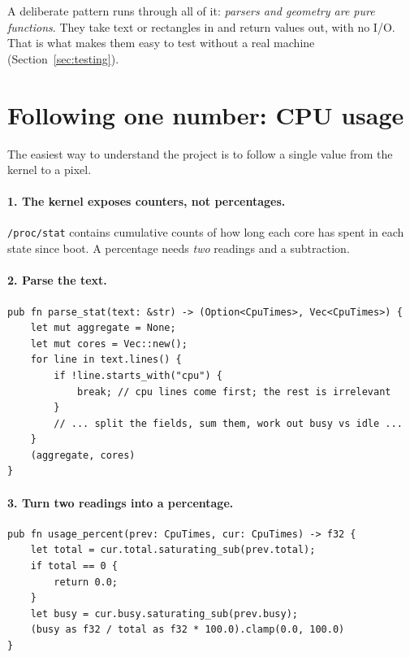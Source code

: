 \documentclass[11pt,a4paper]{article}
\newcommand{\file}[1]{\texttt{#1}}
\begin{document}
A deliberate pattern runs through all of it: \emph{parsers and geometry are pure functions}.
They take text or rectangles in and return values out, with no I/O. That is what makes them
easy to test without a real machine (Section~\ref{sec:testing}).

\section{Following one number: CPU usage}

The easiest way to understand the project is to follow a single value from the kernel to a
pixel.

\paragraph{1. The kernel exposes counters, not percentages.}
\file{/proc/stat} contains cumulative counts of how long each core has spent in each state
since boot. A percentage needs \emph{two} readings and a subtraction.

\paragraph{2. Parse the text.}
\begin{lstlisting}[caption={Parsing \file{/proc/stat} (\file{sampler/cpu.rs}, trimmed).}]
pub fn parse_stat(text: &str) -> (Option<CpuTimes>, Vec<CpuTimes>) {
    let mut aggregate = None;
    let mut cores = Vec::new();
    for line in text.lines() {
        if !line.starts_with("cpu") {
            break; // cpu lines come first; the rest is irrelevant
        }
        // ... split the fields, sum them, work out busy vs idle ...
    }
    (aggregate, cores)
}
\end{lstlisting}

\paragraph{3. Turn two readings into a percentage.}
\begin{lstlisting}[caption={The subtraction (\file{sampler/cpu.rs}).}]
pub fn usage_percent(prev: CpuTimes, cur: CpuTimes) -> f32 {
    let total = cur.total.saturating_sub(prev.total);
    if total == 0 {
        return 0.0;
    }
    let busy = cur.busy.saturating_sub(prev.busy);
    (busy as f32 / total as f32 * 100.0).clamp(0.0, 100.0)
}
\end{lstlisting}
\end{document}
